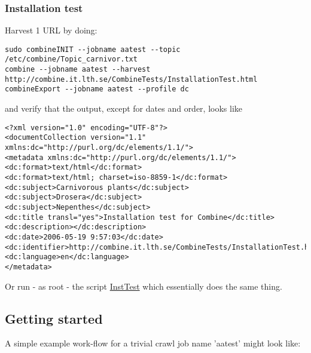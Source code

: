 \subsubsection{Installation test}
Harvest 1 URL by doing:\\
\begin{verbatim}
sudo combineINIT --jobname aatest --topic /etc/combine/Topic_carnivor.txt 
combine --jobname aatest --harvest http://combine.it.lth.se/CombineTests/InstallationTest.html
combineExport --jobname aatest --profile dc
\end{verbatim}
and verify that the output, except for dates and order, looks like\\
\begin{verbatim}
<?xml version="1.0" encoding="UTF-8"?>
<documentCollection version="1.1" xmlns:dc="http://purl.org/dc/elements/1.1/">
<metadata xmlns:dc="http://purl.org/dc/elements/1.1/">
<dc:format>text/html</dc:format>
<dc:format>text/html; charset=iso-8859-1</dc:format>
<dc:subject>Carnivorous plants</dc:subject>
<dc:subject>Drosera</dc:subject>
<dc:subject>Nepenthes</dc:subject>
<dc:title transl="yes">Installation test for Combine</dc:title>
<dc:description></dc:description>
<dc:date>2006-05-19 9:57:03</dc:date>
<dc:identifier>http://combine.it.lth.se/CombineTests/InstallationTest.html</dc:identifier>
<dc:language>en</dc:language>
</metadata>
\end{verbatim}

Or run - as root - the script
\hyperref{{\tt ./doc/InstallationTest.pl}}{{\tt ./doc/InstallationTest.pl} (see Appendix }{)}{InstTest}
which essentially does the same thing.


\subsection{Getting started}
\label{gettingstarted}
A simple example work-flow for a trivial crawl job name 'aatest' might look like:

